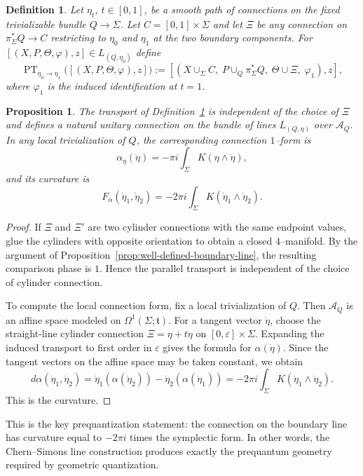\documentclass[12pt]{amsart}
\numberwithin{equation}{section}
\newtheorem{prop}[theorem]{Proposition}
\newtheorem{definition}[theorem]{Definition}
\begin{document}
\begin{definition}
\label{def:cylinder-transport}
Let $\eta_t$, $t\in[0,1]$, be a smooth path of connections on the fixed trivializable
bundle $Q\to \Sigma$.
Let $C=[0,1]\times \Sigma$ and let $\Xi$ be any connection on $\pi_\Sigma^*Q\to C$
restricting to $\eta_0$ and $\eta_1$ at the two boundary components.
For $[(X,P,\Theta,\varphi),z]\in L_{(Q,\eta_0)}$ define
\[
\operatorname{PT}_{\eta_0\to\eta_1}
\bigl([(X,P,\Theta,\varphi),z]\bigr)
:=
[(X\cup_\Sigma C,\;P\cup_Q \pi_\Sigma^*Q,\;\Theta\cup\Xi,\;\varphi_1),z],
\]
where $\varphi_1$ is the induced identification at $t=1$.
\end{definition}

\begin{prop}
\label{prop:boundary-line-connection-curvature}
The transport of Definition~\ref{def:cylinder-transport} is independent of the
choice of $\Xi$ and defines a natural unitary connection on the bundle of
lines $L_{(Q,\eta)}$ over $\mathcal A_Q$.
In any local trivialization of $Q$, the corresponding connection $1$--form is
\[
\alpha_\eta(\dot\eta)
=
-\pi i\int_\Sigma K(\eta\wedge \dot\eta),
\]
and its curvature is
\[
F_\alpha(\dot\eta_1,\dot\eta_2)
=
-2\pi i\int_\Sigma K(\dot\eta_1\wedge \dot\eta_2).
\]
\end{prop}

\begin{proof}
If $\Xi$ and $\Xi'$ are two cylinder connections with the same endpoint values,
glue the cylinders with opposite orientation to obtain a closed $4$--manifold.
By the argument of Proposition~\ref{prop:well-defined-boundary-line},
the resulting comparison phase is $1$. Hence the parallel transport is independent
of the choice of cylinder connection.

To compute the local connection form, fix a local trivialization of $Q$.
Then $\mathcal A_Q$ is an affine space modeled on $\Omega^1(\Sigma;\mathfrak t)$.
For a tangent vector $\dot\eta$, choose the straight-line cylinder connection $\Xi=\eta+t\dot\eta$
on $[0,\varepsilon]\times \Sigma$. Expanding the induced transport to first order
in $\varepsilon$ gives the formula for $\alpha(\dot\eta)$.
Since the tangent vectors on the affine space may be taken constant, we obtain
\[
d\alpha(\dot\eta_1,\dot\eta_2)
=
\dot\eta_1\!\left(\alpha(\dot\eta_2)\right)
-
\dot\eta_2\!\left(\alpha(\dot\eta_1)\right)
=
-2\pi i\int_\Sigma K(\dot\eta_1\wedge \dot\eta_2).
\]
This is the curvature.
\end{proof}

This is the key prequantization statement: the connection on the boundary line has curvature equal to \(-2\pi i\) times the symplectic form. In other words, the Chern--Simons line construction produces exactly the prequantum geometry
required by geometric quantization.
\end{document}

